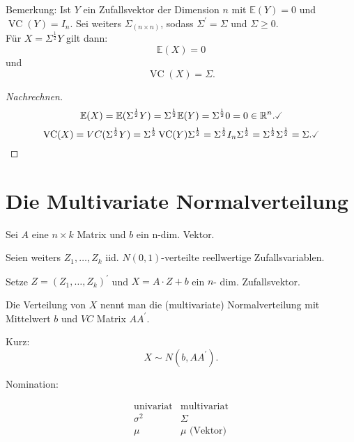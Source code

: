 \documentclass{tstextbook}
\DeclareMathOperator{\VC}{VC} %
\newcommand{\E}{\mathbb E}
\newcommand{\R}{\mathbb R}
\begin{document}
	\begin{remark}
		Bemerkung: Ist $ Y $ ein Zufallsvektor der Dimension $ n $ mit $ \E(Y) = 0 $ und $ \VC(Y) = I_n $. Sei weiters $ \Sigma_{(n \times n)} $, sodass $ \Sigma^\prime = \Sigma $ und $ \Sigma \ge 0 $. \\
		Für $ X = \Sigma^{\frac{1}{2}} Y $ gilt dann: \[ \E(X) = 0 \] und \[ \VC(X) = \Sigma. \]
	\end{remark}
	
	\begin{proof}[Nachrechnen]
		\[
		\E(X) = \E(\Sigma^{\frac{1}{2}} Y) = \Sigma^{\frac{1}{2}} \E(Y) = \Sigma^{\frac{1}{2}} 0 = 0 \in \R^n. \checked
		\]
		\[ \VC(X) = VC(\Sigma^{\frac{1}{2}} Y) = \Sigma^{\frac{1}{2}} \VC(Y) \Sigma^{\frac{1}{2}} = \Sigma^{\frac{1}{2}} I_n \Sigma^{\frac{1}{2}} = \Sigma^{\frac{1}{2}} \Sigma^{\frac{1}{2}} = \Sigma. \checked \]
	\end{proof}
	
\section{Die Multivariate Normalverteilung}


\begin{definition}
	
	Sei $A$ eine $n\times k$ Matrix und $b$ ein n-dim. Vektor. 
	
	Seien weiters $Z_{1},\ldots,Z_{k}$ iid. $N(0,1)$-verteilte reellwertige Zufallsvariablen. 
	
	Setze $Z=\left(Z_{1},\ldots,Z_{k}\right)^{\prime}$ und $X=A\cdot Z+b$
	ein $n$- dim. Zufallsvektor.
	
	Die Verteilung von $X$ nennt man die (multivariate) Normalverteilung
	mit Mittelwert $b$ und $VC$ Matrix $AA^{\prime}.$
	
	Kurz: 
	\[
	X\sim N(b,AA^{\prime}).
	\]
	
	Nomination:
	
	\[
	\begin{array}{cc}
		\text{univariat} & \text{multivariat}\\
		\sigma^{2} & \Sigma\\
		\mu & \mu\text{ (Vektor)}
	\end{array}
	\]
	\end{definition}
\end{document}
